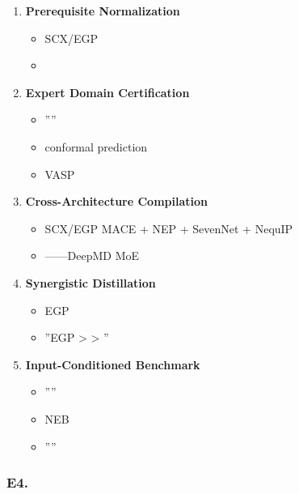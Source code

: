 \documentclass[
  12pt,
]{article}
\providecommand{\tightlist}{%
  \setlength{\itemsep}{0pt}\setlength{\parskip}{0pt}}
\begin{document}
\begin{enumerate}
\def\labelenumi{\arabic{enumi}.}
\tightlist
\item
  \textbf{Prerequisite Normalization}

  \begin{itemize}
  \tightlist
  \item
     SCX/EGP 
  \item
    \textbf{}
  \end{itemize}
\item
  \textbf{Expert Domain Certification}

  \begin{itemize}
  \tightlist
  \item
    ''''
  \item
     conformal prediction 
  \item
     VASP
    
  \end{itemize}
\item
  \textbf{Cross-Architecture Compilation}

  \begin{itemize}
  \tightlist
  \item
     SCX/EGP  MACE + NEP + SevenNet + NequIP 
  \item
    ------DeepMD
    MoE 
  \end{itemize}
\item
  \textbf{Synergistic Distillation}

  \begin{itemize}
  \tightlist
  \item
     EGP 
  \item
    ''EGP  \textgreater{}  \textgreater{}
    ''
  \end{itemize}
\item
  \textbf{Input-Conditioned Benchmark}

  \begin{itemize}
  \tightlist
  \item
    ''''
  \item
     NEB 
  \item
    ''''
  \end{itemize}
\end{enumerate}

\subsubsection{E4. }\label{e4.-ux5efaux8baeux884cux52a8ux9879}
\end{document}
